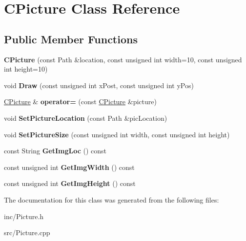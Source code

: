 \hypertarget{classCPicture}{\section{C\-Picture Class Reference}
\label{classCPicture}
}
\subsection*{Public Member Functions}
\begin{DoxyCompactItemize}
\item 
\hypertarget{classCPicture_ab0aeabcb8789ee9f98cf86711cb7d709}{{\bfseries C\-Picture} (const Path \&location, const unsigned int width=10, const unsigned int height=10)}\label{classCPicture_ab0aeabcb8789ee9f98cf86711cb7d709}

\item 
\hypertarget{classCPicture_a00209611ef5fd84cd5acd867f9b6c89f}{void {\bfseries Draw} (const unsigned int x\-Post, const unsigned int y\-Pos)}\label{classCPicture_a00209611ef5fd84cd5acd867f9b6c89f}

\item 
\hypertarget{classCPicture_a3e98c0c303e309615fdc204792602f68}{\hyperlink{classCPicture}{C\-Picture} \& {\bfseries operator=} (const \hyperlink{classCPicture}{C\-Picture} \&picture)}\label{classCPicture_a3e98c0c303e309615fdc204792602f68}

\item 
\hypertarget{classCPicture_af7e2b2400001ecd701130a03ced37ce0}{void {\bfseries Set\-Picture\-Location} (const Path \&pic\-Location)}\label{classCPicture_af7e2b2400001ecd701130a03ced37ce0}

\item 
\hypertarget{classCPicture_a83f2b834109c9cbf33dfe790a5df2746}{void {\bfseries Set\-Picture\-Size} (const unsigned int width, const unsigned int height)}\label{classCPicture_a83f2b834109c9cbf33dfe790a5df2746}

\item 
\hypertarget{classCPicture_ab5934d9dbdfdfd0b03d9d137277d5115}{const String {\bfseries Get\-Img\-Loc} () const }\label{classCPicture_ab5934d9dbdfdfd0b03d9d137277d5115}

\item 
\hypertarget{classCPicture_a3c77bc3389f93d220a4af55f177b2fa8}{const unsigned int {\bfseries Get\-Img\-Width} () const }\label{classCPicture_a3c77bc3389f93d220a4af55f177b2fa8}

\item 
\hypertarget{classCPicture_aa5b4142c5ab12957e0df30a6c41dc5c5}{const unsigned int {\bfseries Get\-Img\-Height} () const }\label{classCPicture_aa5b4142c5ab12957e0df30a6c41dc5c5}

\end{DoxyCompactItemize}


The documentation for this class was generated from the following files\-:\begin{DoxyCompactItemize}
\item 
inc/Picture.\-h\item 
src/Picture.\-cpp\end{DoxyCompactItemize}
